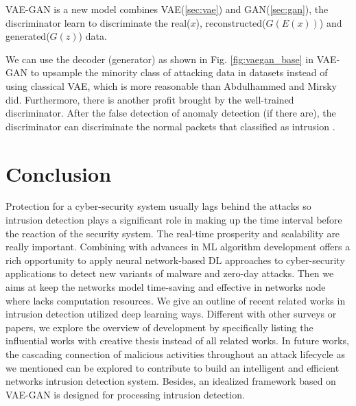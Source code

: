 \documentclass[conference]{IEEEtran}
\begin{document}
VAE-GAN is a new model combines VAE(\ref{sec:vae}) and GAN(\ref{sec:gan}), the discriminator learn to discriminate the real($x$), reconstructed($G(E(x))$) and generated($G(z)$) data. 

We can use the decoder (generator) as shown in Fig. \ref{fig:vaegan_base} in VAE-GAN to upsample the minority class of attacking data in datasets instead of using classical VAE, which is more reasonable than Abdulhammed \cite{abdulhammed2019deep} and Mirsky \cite{mirsky2018kitsune} did. Furthermore, there is another profit brought by the well-trained discriminator. After the false detection of anomaly detection (if there are), the discriminator can discriminate the normal packets that classified as intrusion . 




\section{Conclusion}
Protection for a cyber-security system usually lags behind the attacks so intrusion detection plays a significant role in making up the time interval before the reaction of the security system.
The real-time prosperity and scalability are really important. Combining with advances in ML algorithm development offers a rich opportunity to apply neural network-based DL approaches to cyber-security applications to detect new variants of malware and zero-day attacks. Then we aims at keep the networks model time-saving and effective in networks node where lacks computation resources. We give an outline of recent related works in intrusion detection utilized deep learning ways. Different with other surveys or papers, we explore the overview of development by specifically listing the influential works with creative thesis instead of all related works. In future works, the cascading connection of malicious activities throughout an attack lifecycle as we mentioned can be explored to contribute to build an intelligent and efficient networks intrusion detection system. Besides, an idealized framework based on VAE-GAN is designed for processing intrusion detection. 

\end{document}
